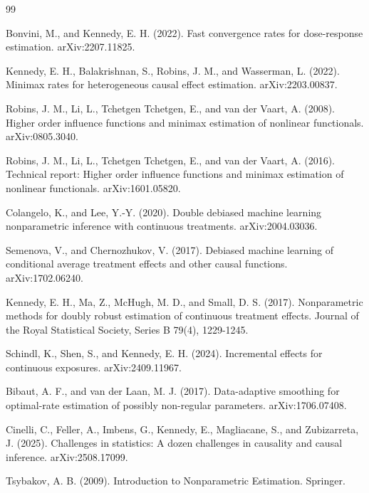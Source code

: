 \documentclass{article}
\begin{document}
\begin{thebibliography}{99}

   Bonvini, M., and Kennedy, E. H. (2022). Fast convergence rates for dose-response estimation. arXiv:2207.11825.

   Kennedy, E. H., Balakrishnan, S., Robins, J. M., and Wasserman, L. (2022). Minimax rates for heterogeneous causal effect estimation. arXiv:2203.00837.

   Robins, J. M., Li, L., Tchetgen Tchetgen, E., and van der Vaart, A. (2008). Higher order influence functions and minimax estimation of nonlinear functionals. arXiv:0805.3040.

   Robins, J. M., Li, L., Tchetgen Tchetgen, E., and van der Vaart, A. (2016). Technical report: Higher order influence functions and minimax estimation of nonlinear functionals. arXiv:1601.05820.

   Colangelo, K., and Lee, Y.-Y. (2020). Double debiased machine learning nonparametric inference with continuous treatments. arXiv:2004.03036.

   Semenova, V., and Chernozhukov, V. (2017). Debiased machine learning of conditional average treatment effects and other causal functions. arXiv:1702.06240.

   Kennedy, E. H., Ma, Z., McHugh, M. D., and Small, D. S. (2017). Nonparametric methods for doubly robust estimation of continuous treatment effects. Journal of the Royal Statistical Society, Series B 79(4), 1229-1245.

   Schindl, K., Shen, S., and Kennedy, E. H. (2024). Incremental effects for continuous exposures. arXiv:2409.11967.

   Bibaut, A. F., and van der Laan, M. J. (2017). Data-adaptive smoothing for optimal-rate estimation of possibly non-regular parameters. arXiv:1706.07408.

   Cinelli, C., Feller, A., Imbens, G., Kennedy, E., Magliacane, S., and Zubizarreta, J. (2025). Challenges in statistics: A dozen challenges in causality and causal inference. arXiv:2508.17099.

   Tsybakov, A. B. (2009). Introduction to Nonparametric Estimation. Springer.

\end{thebibliography}
\end{document}
